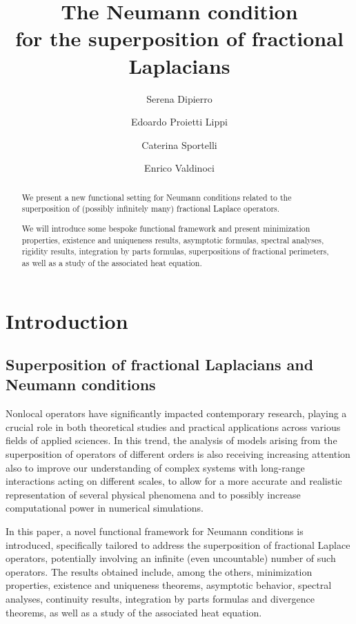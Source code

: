 \documentclass[12pt,a4paper,intlimits,sumlimits]{amsart}
\title[Superposition of fractional Laplacians]{The Neumann condition\\
for the superposition of fractional Laplacians}
\author[S. Dipierro]{Serena Dipierro}
\author[E. Proietti Lippi]{Edoardo Proietti Lippi}
\author[C. Sportelli]{Caterina Sportelli}
\author[E. Valdinoci]{Enrico Valdinoci}
\date{}
\theoremstyle{definition}
\theoremstyle{plain}
\numberwithin{equation}{section}
\begin{document}
 \maketitle

\begin{abstract}
We present a new functional setting for
Neumann conditions related to the
superposition of (possibly infinitely many) fractional Laplace operators.

We will introduce some bespoke
functional framework and present minimization properties, 
existence and uniqueness results, asymptotic formulas, spectral analyses, rigidity results,
integration by parts formulas, superpositions of fractional perimeters, as well as a study of the associated heat equation.
\end{abstract}
 
\tableofcontents{}
 
\section{Introduction} 

\subsection{Superposition of fractional Laplacians and Neumann conditions}

Nonlocal operators have significantly impacted contemporary research, playing a crucial role in both theoretical studies and practical applications across various fields of applied sciences. In this trend, the analysis of models arising from
the superposition of operators of different orders is also receiving increasing attention also
to improve our understanding of complex systems with long-range interactions acting
on different scales,
to allow for a more accurate and realistic representation of several physical phenomena
and to possibly increase computational power in numerical simulations.

In this paper, a novel functional framework for Neumann conditions is introduced, specifically tailored to address the superposition of fractional Laplace operators, potentially involving an infinite (even uncountable) number of such operators. The results obtained include, among the others, minimization properties, existence and uniqueness theorems, asymptotic behavior, spectral analyses, continuity results, integration by parts formulas and divergence theorems, as well as a study of the associated heat equation.
\end{document}
